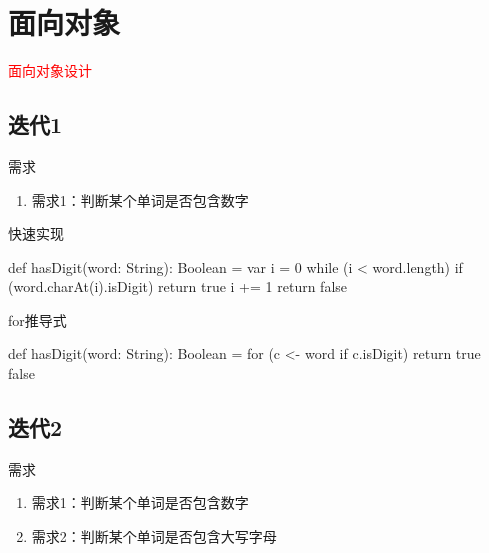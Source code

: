 \section{面向对象}
\label{sec:oodesign}

\begin{frame}
  \begin{center}
    \Huge{\textcolor{red}{面向对象设计}}
  \end{center}
\end{frame}

\subsection{迭代1}

\begin{frame}{需求}
  \begin{block}{}
    \begin{enumerate}
      \item<alert@1-> 需求1：判断某个单词是否包含数字
    \end{enumerate}
  \end{block}
\end{frame}

\begin{frame}[fragile]{快速实现}
  \begin{scala}
def hasDigit(word: String): Boolean = {
  var i = 0
  while (i < word.length) {
    if (word.charAt(i).isDigit) 
      return true
    i += 1
  }
  return false
}
  \end{scala}
\end{frame}

\begin{frame}[fragile]{for推导式}
  \begin{scala}
def hasDigit(word: String): Boolean = {
  for (c <- word if c.isDigit) 
    return true
  false
}
  \end{scala}
\end{frame}

\subsection{迭代2}

\begin{frame}{需求}
  \begin{block}{}
    \begin{enumerate}
    \item \alert{需求1}：判断某个单词是否包含数字
    \item<alert@1-> 需求2：判断某个单词是否包含大写字母
    \end{enumerate}
  \end{block}
\end{frame}

